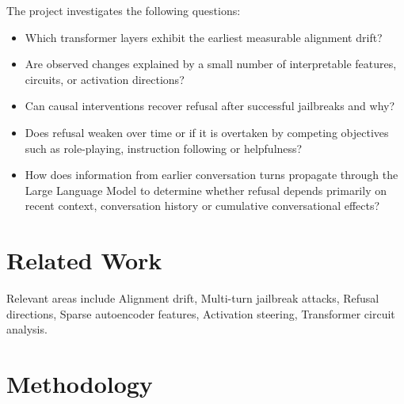 \documentclass[11pt]{article}
\begin{document}
The project investigates the following questions:
\begin{itemize}

    \item
    Which transformer layers exhibit the earliest measurable alignment drift?

    \item
    Are observed changes explained by a small number of interpretable features, 
    circuits, or activation directions?

    \item
    Can causal interventions recover refusal after successful jailbreaks and why?

    \item 
    Does refusal weaken over time or if it is overtaken by competing objectives 
    such as role-playing, instruction following or helpfulness?

    \item 
    How does information from earlier conversation turns propagate through the
    Large Language Model to determine whether refusal depends primarily on recent
    context, conversation history or cumulative conversational effects? 

\end{itemize}

\section{Related Work}

Relevant areas include Alignment drift, Multi-turn jailbreak attacks, 
Refusal directions, Sparse autoencoder features, Activation steering,
Transformer circuit analysis.

\section{Methodology}
\end{document}
